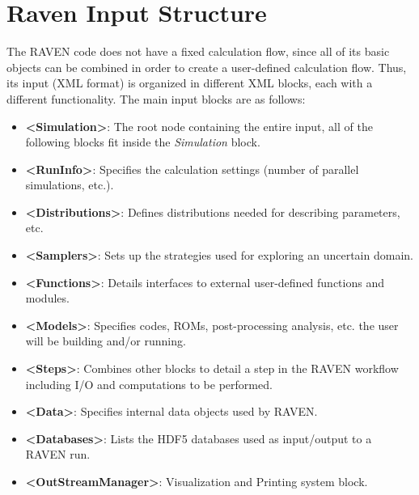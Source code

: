 \section{Raven Input Structure}
The RAVEN code does not have a fixed calculation flow, since all of its basic
objects can be combined in order to create a user-defined calculation flow.
%
Thus, its input (XML format) is organized in different XML blocks, each with a
different functionality.
%
The main input blocks are as follows:
\begin{itemize}
  \item \textbf{\textless Simulation\textgreater}: The root node containing the
  entire input, all of
  the following blocks fit inside the \emph{Simulation} block.
  \item \textbf{\textless RunInfo\textgreater}: Specifies the calculation
  settings (number of parallel simulations, etc.).
  \item \textbf{\textless Distributions\textgreater}: Defines distributions
  needed for describing parameters, etc.
  \item \textbf{\textless Samplers\textgreater}: Sets up the strategies used for
  exploring an uncertain domain.
  \item \textbf{\textless Functions\textgreater}: Details interfaces to external
  user-defined functions and modules.
  \item \textbf{\textless Models\textgreater}: Specifies codes, ROMs,
  post-processing analysis, etc.
  the user will be building and/or running.
  \item \textbf{\textless Steps\textgreater}: Combines other blocks to detail a
  step in the RAVEN workflow including I/O and computations to be performed.
  \item \textbf{\textless Data\textgreater}: Specifies internal data objects
  used by RAVEN.
  \item \textbf{\textless Databases\textgreater}: Lists the HDF5 databases used
  as input/output to a
  RAVEN run.
  \item \textbf{\textless OutStreamManager\textgreater}: Visualization and
  Printing system block.
\end{itemize}

